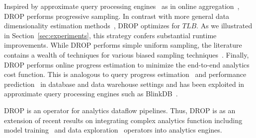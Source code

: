 Inspired by approximate query processing engines~\cite{barzan-keynote}
as in online aggregation~\cite{onlineagg}, DROP performs progressive
sampling.  In contrast
with more general data dimensionality estimation
methods~\cite{dr-estimation}, DROP optimizes for
$TLB$. As we illustrated in Section~\ref{sec:experiments}, this
strategy confers substantial runtime improvements.
While DROP performs simple uniform sampling, the literature contains a wealth of techniques for various biased sampling techniques~\cite{surajit-sample, surajit-2}.
Finally, DROP performs online progress estimation to minimize the
end-to-end analytics cost function. This is analogous to query
progress estimation~\cite{qpi1} and performance
prediction~\cite{mr-predict} in database and data
warehouse settings and has been exploited in approximate query
processing engines such as BlinkDB~\cite{blinkdb}. 

 DROP is an operator
for analytics dataflow pipelines. Thus, DROP is
as an extension of recent results on integrating complex
analytics function including model training~\cite{bismarck,mcdb,mlbase} and
data exploration~\cite{scorpion,canopy,kraska-viz} operators into analytics engines. 

